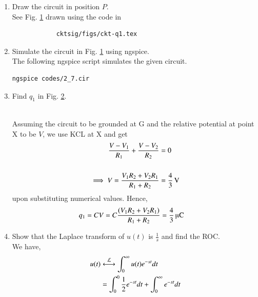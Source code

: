 \documentclass[journal,12pt,twocolumn]{IEEEtran}
\renewcommand\thesection{\arabic{section}}
\begin{document}
\begin{enumerate}[label=\arabic*.,ref=\thesection.\theenumi]
\item Draw the circuit in position $P$.
	\\
		\solution See Fig. 
    \ref{fig:cktsig/ckt-q1}
drawn using the code in 
		\begin{lstlisting}
			cktsig/figs/ckt-q1.tex
		\end{lstlisting}
\begin{figure}[!h]
	\centering
	
    \caption{}
    \label{fig:cktsig/ckt-q1}
\end{figure}
\item Simulate the circuit in 
    Fig. \ref{fig:cktsig/ckt-q1}
using ngspice.
\\
\solution The following ngspice script  simulates the given circuit.
\begin{lstlisting}
ngspice codes/2_7.cir
\end{lstlisting}
\item Find $q_1$ in Fig. 
\ref{fig:cktsig/sckt-q1-steady}.
\begin{figure}[!htb]
	\centering
	
\caption{}
\label{fig:cktsig/sckt-q1-steady}
\end{figure}
\\
\solution Assuming the circuit to be grounded at G and the relative potential at point
X to be $V$, we use KCL at X and get
\begin{align}
	\frac{V - V_1}{R_1} + \frac{V - V_2}{R_2} &= 0 \\
	\\
	\implies V = \frac{V_1R_2 + V_2R_1}{R_1+R_2}&=
      \SI[parse-numbers=false]{\frac{4}{3}}{\V}
\end{align}
upon substituting numerical values.
Hence,
\begin{align}
    q_1 = CV = 
	  C\frac{\brak{V_1R_2 + V_2R_1}}{R_1+R_2}&=
     \SI[parse-numbers=false]{\frac{4}{3}}{\micro\coulomb}
\end{align}
\item Show that the Laplace transform of $u(t)$ is $\frac{1}{s}$ and find the ROC.
	\\
\solution We have,
\begin{align}
	u(t) &\system{L} \int_{0}^{\infty}u(t)e^{-st}dt \\
         &= \int_{0}^{0}\frac{1}{2}e^{-st}dt + \int_{0}^{\infty}e^{-st}dt \\

\end{align}
\end{enumerate}
\end{document}
